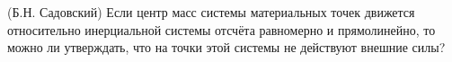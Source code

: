 (Б.Н. Садовский)
Если центр масс системы материальных точек движется относительно
инерциальной системы отсчёта равномерно и прямолинейно, то можно ли
утверждать, что на точки этой системы не действуют внешние силы?
